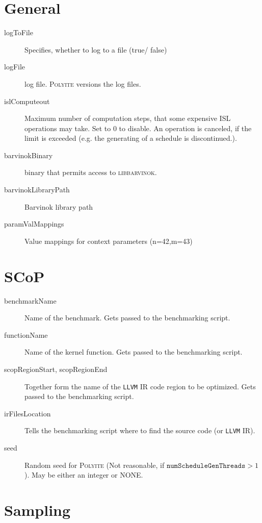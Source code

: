 \documentclass{article}
\begin{document}
\section{General}
\begin{description}
\item[logToFile] Specifies, whether to log to a file (true/ false)
\item[logFile] log file. \textsc{Polyite} versions the log files.
\item[islComputeout] Maximum number of computation steps, that some expensive
ISL operations may take. Set to 0 to disable. An operation is canceled, if the
limit is exceeded (e.g. the generating of a schedule is discontinued.).
\item[barvinokBinary] binary that permits access to \textsc{libbarvinok}.
\item[barvinokLibraryPath] Barvinok library path
\item[paramValMappings] Value mappings for context parameters (n=42,m=43)
\end{description}

\section{SCoP}

\begin{description}
  \item[benchmarkName] Name of the benchmark. Gets passed to the benchmarking script.
  \item[functionName] Name of the kernel function. Gets passed to the benchmarking script.
  \item[scopRegionStart, scopRegionEnd] Together form the name of the \texttt{LLVM} IR
    code region to be optimized. Gets passed to the benchmarking script.
  \item[irFilesLocation] Tells the benchmarking script where to find the source code (or \texttt{LLVM} IR).
  \item[seed] Random seed for \textsc{Polyite} (Not reasonable, if $\texttt{numScheduleGenThreads} > 1$). May be either an integer or NONE.
\end{description}

\section{Sampling}
\end{document}
